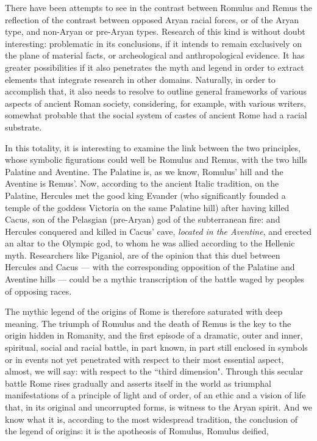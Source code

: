There have been attempts to see in the contrast between Romulus and Remus the reflection of the contrast between opposed Aryan racial forces, or of the Aryan type, and non-Aryan or pre-Aryan types. Research of this kind is without doubt interesting: problematic in its conclusions, if it intends to remain exclusively on the plane of material facts, or archeological and anthropological evidence. It has greater possibilities if it also penetrates the myth and legend in order to extract elements that integrate research in other domains. Naturally, in order to accomplish that, it also needs to resolve to outline general frameworks of various aspects of ancient Roman society, considering, for example, with various writers, somewhat probable that the social system of castes of ancient Rome had a racial substrate.

In this totality, it is interesting to examine the link between the two principles, whose symbolic figurations could well be Romulus and Remus, with the two hills Palatine and Aventine. The Palatine is, as we know, Romulus' hill and the Aventine is Remus'. Now, according to the ancient Italic tradition, on the Palatine, Hercules met the good king Evander (who significantly founded a temple of the goddess Victoria on the same Palatine hill) after having killed Cacus, son of the Pelasgian (pre-Aryan) god of the subterranean fire: and Hercules conquered and killed in Cacus' cave, \emph{located in the Aventine}, and erected an altar to the Olympic god, to whom he was allied according to the Hellenic myth. Researchers like Piganiol, are of the opinion that this duel between Hercules and Cacus — with the corresponding opposition of the Palatine and Aventine hills — could be a mythic transcription of the battle waged by peoples of opposing races.

The mythic legend of the origins of Rome is therefore saturated with deep meaning. The triumph of Romulus and the death of Remus is the key to the origin hidden in Romanity, and the first episode of a dramatic, outer and inner, spiritual, social and racial battle, in part known, in part still enclosed in symbols or in events not yet penetrated with respect to their most essential aspect, almost, we will say: with respect to the ``third dimension". Through this secular battle Rome rises gradually and asserts itself in the world as triumphal manifestations of a principle of light and of order, of an ethic and a vision of life that, in its original and uncorrupted forms, is witness to the Aryan spirit. And we know what it is, according to the most widespread tradition, the conclusion of the legend of origins: it is the apotheosis of Romulus, Romulus deified,

